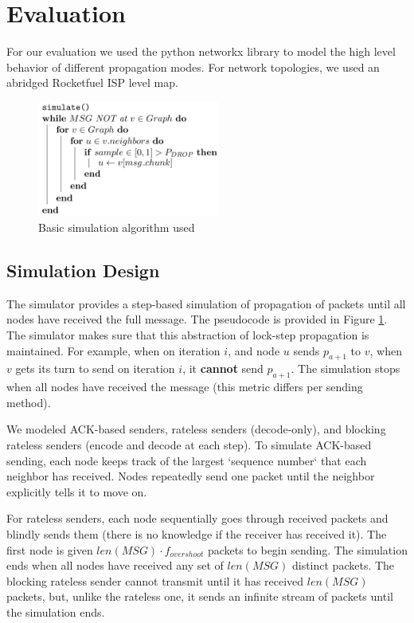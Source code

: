 \section{Evaluation}
For our evaluation we used the python networkx library to model the high level behavior of different propagation modes.\cite{nwx}
For network topologies, we used an abridged Rocketfuel ISP level map. \cite{rocketfuel}

\begin{figure}[tp]
\centering
\includegraphics[width=6cm]{figures/algo_v2.png}
\caption{Basic simulation algorithm used}
\label{algo:a1}
\end{figure}

\subsection{Simulation Design}
The simulator provides a step-based simulation of propagation of packets until all nodes have received the full message. The pseudocode is provided in Figure \ref{algo:a1}. The simulator makes sure that this abstraction of lock-step propagation is maintained. For example, when on iteration $i$, and node $u$ sends $p_{a+1}$ to $v$, when $v$ gets its turn to send on iteration $i$, it \textbf{cannot} send $p_{a+1}$. The simulation stops when all nodes have received the message (this metric differs per sending method). 

We modeled ACK-based senders, rateless senders (decode-only), and blocking rateless senders (encode and decode at each step). To simulate ACK-based sending, each node keeps track of the largest `sequence number` that each neighbor has received. Nodes repeatedly send one packet until the neighbor explicitly tells it to move on. 

For rateless senders, each node sequentially goes through received packets and blindly sends them (there is no knowledge if the receiver has received it). The first node is given $len(MSG)\cdot f_{overshoot}$ packets to begin sending. The simulation ends when all nodes have received any set of $len(MSG)$ distinct packets. The blocking rateless sender cannot transmit until it has received $len(MSG)$ packets, but, unlike the rateless one, it sends an infinite stream of packets until the simulation ends.


